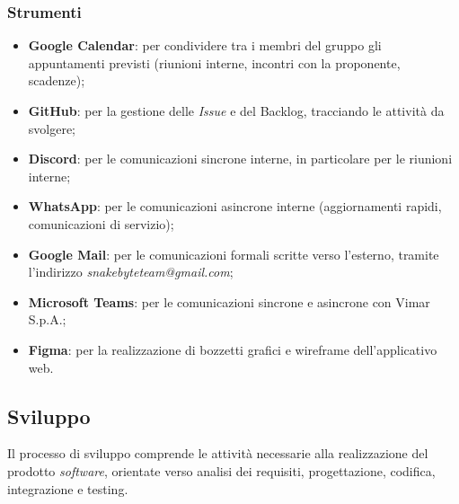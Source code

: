 \documentclass[10pt, letterpaper]{article}
\begin{document}
\subsubsection{Strumenti}
\begin{itemize}
    \item \textbf{Google Calendar}: per condividere tra i membri del gruppo gli appuntamenti previsti (riunioni interne, incontri con la proponente, scadenze);
    \item \textbf{GitHub}: per la gestione delle \textit{Issue} e del Backlog, tracciando le attività da svolgere;
    \item \textbf{Discord}: per le comunicazioni sincrone interne, in particolare per le riunioni interne;
    \item \textbf{WhatsApp}: per le comunicazioni asincrone interne (aggiornamenti rapidi, comunicazioni di servizio);
    \item \textbf{Google Mail}: per le comunicazioni formali scritte verso l'esterno, tramite l'indirizzo \textit{snakebyteteam@gmail.com};
    \item \textbf{Microsoft Teams}: per le comunicazioni sincrone e asincrone con Vimar S.p.A.;
    \item \textbf{Figma}: per la realizzazione di bozzetti grafici e wireframe dell'applicativo web.
\end{itemize}


\subsection{Sviluppo}
Il processo di sviluppo comprende le attività necessarie alla realizzazione del prodotto \textit{software}, orientate verso analisi dei requisiti, progettazione, codifica, integrazione e testing.
\end{document}
